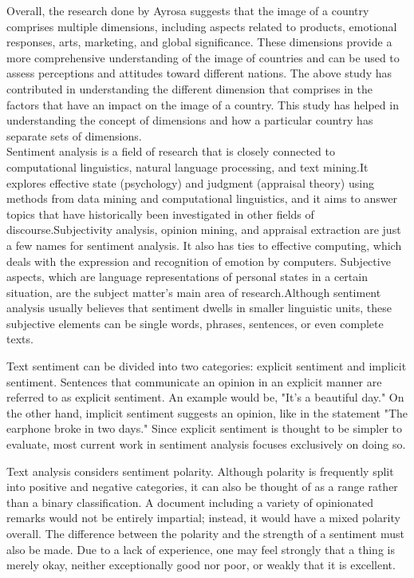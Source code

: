 \documentclass[conference]{IEEEtran}
\begin{document}
	Overall, the research done by Ayrosa suggests that the image of a country comprises multiple dimensions, including aspects related to products, emotional responses, arts, marketing, and global significance. These dimensions provide a more comprehensive understanding of the image of countries and can be used to assess perceptions and attitudes toward different nations. The above study has contributed in understanding the different dimension that comprises in the factors that have an impact on the image of a country. This study has helped in understanding the concept of dimensions and how a particular country has separate sets of dimensions.\\

	Sentiment analysis is a field of research that is closely connected to computational linguistics, natural language processing, and text mining.It explores effective state (psychology) and judgment (appraisal theory) using methods from data mining and computational linguistics, and it aims to answer topics that have historically been investigated in other fields of discourse.Subjectivity analysis, opinion mining, and appraisal extraction are just a few names for sentiment analysis. It also has ties to effective computing, which deals with the expression and recognition of emotion by computers. Subjective aspects, which are language representations of personal states in a certain situation, are the subject matter's main area of research.Although sentiment analysis usually believes that sentiment dwells in smaller linguistic units, these subjective elements can be single words, phrases, sentences, or even complete texts. 

	Text sentiment can be divided into two categories: explicit sentiment and implicit sentiment. Sentences that communicate an opinion in an explicit manner are referred to as explicit sentiment. An example would be, "It's a beautiful day." On the other hand, implicit sentiment suggests an opinion, like in the statement "The earphone broke in two days." Since explicit sentiment is thought to be simpler to evaluate, most current work in sentiment analysis focuses exclusively on doing so. 

	Text analysis considers sentiment polarity. Although polarity is frequently split into positive and negative categories, it can also be thought of as a range rather than a binary classification. A document including a variety of opinionated remarks would not be entirely impartial; instead, it would have a mixed polarity overall. The difference between the polarity and the strength of a sentiment must also be made. Due to a lack of experience, one may feel strongly that a thing is merely okay, neither exceptionally good nor poor, or weakly that it is excellent.  
\end{document}
